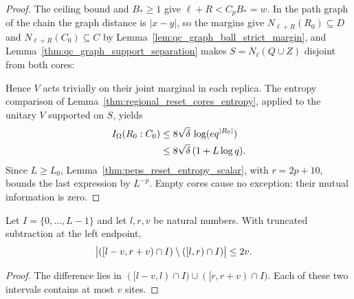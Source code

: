 \begin{proof}
    The ceiling bound and $B_*\ge1$ give
    $\ell+R<C_pB_*=w$.
    In the path graph of the chain the graph distance is $|x-y|$, so the
    margins give $N_{\ell+R}(R_0)\subseteq D$ and $N_{\ell+R}(C_0)\subseteq C$
    by Lemma~\ref{lem:qc_graph_ball_strict_margin}, and
    Lemma~\ref{thm:qc_graph_support_separation} makes $S=N_\ell(Q\cup Z)$
    disjoint from both cores:
    
    Hence $V$ acts trivially on their joint marginal in each
    replica. The entropy comparison of
    Lemma~\ref{thm:regional_reset_cores_entropy}, applied to the unitary
    $V$ supported on $S$, yields
    \begin{align}
        I_\Omega(R_0:C_0)
         & \le8\sqrt\delta\,\log(e q^{|R_0|})\notag \\
         & \le8\sqrt\delta\,(1+L\log q).
    \end{align}
    Since $L\ge L_0$, Lemma~\ref{thm:peps_reset_entropy_scalar}, with
    $r=2p+10$, bounds the last expression by $L^{-p}$.
    Empty cores cause no exception: their mutual information is zero.
\end{proof}

\begin{lemma}
    \label{thm:chain_interval_enlargement_size}
    \leanok
    Let $I=\{0,\ldots,L-1\}$ and let $l,r,v$ be natural numbers.
    With truncated subtraction at the left endpoint,
    \begin{align}
        \bigl|([l-v,r+v)\cap I)\setminus(\lbrack l,r)\cap I)\bigr|
         & \le2v.\notag
    \end{align}
\end{lemma}
\begin{proof}
    \leanok
    The difference lies in $([l-v,l)\cap I)\cup(\lbrack r,r+v)\cap I)$.
    Each of these two intervals contains at most $v$ sites.
\end{proof}

